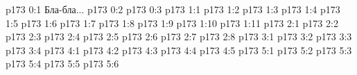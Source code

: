 \author{Промежуточные создания}
\vs p173 0:1  Бла-бла...
\vs p173 0:2 
\vs p173 0:3 
\vs p173 1:1 
\vs p173 1:2 
\vs p173 1:3 \pc 
\vs p173 1:4 
\vs p173 1:5 \pc 
\vs p173 1:6 
\vs p173 1:7 
\vs p173 1:8 
\vs p173 1:9 \pc 
\vs p173 1:10 
\vs p173 1:11 
\vs p173 2:1 
\vs p173 2:2 
\vs p173 2:3 
\vs p173 2:4 
\vs p173 2:5 
\vs p173 2:6 \pc 
\vs p173 2:7 
\vs p173 2:8 
\vs p173 3:1 
\vs p173 3:2 
\vs p173 3:3 
\vs p173 3:4 
\vs p173 4:1 
\vs p173 4:2 \pc 
\vs p173 4:3 \pc 
\vs p173 4:4 
\vs p173 4:5 
\vs p173 5:1 
\vs p173 5:2 \pc 
\vs p173 5:3 
\vs p173 5:4 \pc 
\vs p173 5:5 
\vs p173 5:6 
\quizlink
